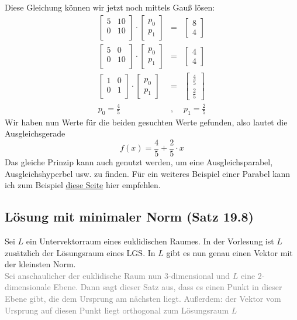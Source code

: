 \documentclass{article}
\begin{document}
				Diese Gleichung können wir jetzt noch mittels Gauß lösen:
				\begin{eqnarray*}
					\begin{bmatrix}
						5 & 10 \\ 0 & 10 \\
					\end{bmatrix} \cdot \begin{bmatrix}
						p_0 \\ p_1
					\end{bmatrix} &=& \begin{bmatrix} 8 \\ 4 \end{bmatrix} \\
					\begin{bmatrix}
						5 & 0 \\ 0 & 10 \\
					\end{bmatrix} \cdot \begin{bmatrix}
						p_0 \\ p_1
					\end{bmatrix} &=& \begin{bmatrix} 4 \\ 4 \end{bmatrix} \\
					\begin{bmatrix}
						1 & 0 \\ 0 & 1 \\
					\end{bmatrix} \cdot \begin{bmatrix}
						p_0 \\ p_1
					\end{bmatrix} &=& \begin{bmatrix} \frac45 \\ \frac25 \end{bmatrix} \\
					p_0 = \frac45 &, & p_1 = \frac25
				\end{eqnarray*}
				Wir haben nun Werte für die beiden gesuchten Werte gefunden, also lautet die Ausgleichsgerade
				\begin{equation*}
					f(x) = \frac45 + \frac25 \cdot x
				\end{equation*}
				Das gleiche Prinzip kann auch genutzt werden, um eine Ausgleichsparabel, Ausgleichshyperbel usw. zu finden. Für ein weiteres Beispiel einer Parabel kann ich zum Beispiel \href{https://www.abi-mathe.de/buch/matrizen/methode-der-kleinsten-quadrate/}{diese Seite} hier empfehlen.
			\subsection{Lösung mit minimaler Norm (Satz 19.8)}
				Sei $L$ ein Untervektorraum eines euklidischen Raumes. In der Vorlesung ist $L$ zusätzlich der Lösungsraum eines LGS. In $L$ gibt es nun genau einen Vektor mit der kleinsten Norm.\\
				\textcolor{gray}{Sei anschaulicher der euklidische Raum nun 3-dimensional und $L$ eine 2-dimensionale Ebene. Dann sagt dieser Satz aus, dass es einen Punkt in dieser Ebene gibt, die dem Ursprung am nächsten liegt. Außerdem: der Vektor vom Ursprung auf diesen Punkt liegt orthogonal zum Lösungsraum $L$}
\end{document}
